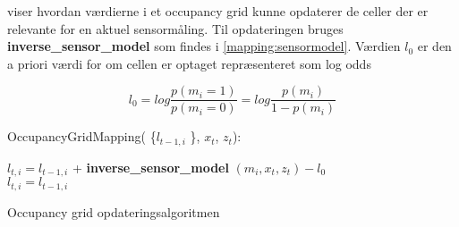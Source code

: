  viser hvordan værdierne i et occupancy grid kunne opdaterer de celler der er relevante for en aktuel sensormåling. 
Til opdateringen bruges \textbf{inverse\_sensor\_model} som findes i \cref{mapping:sensormodel}. 
Værdien $ l_0 $ er den a priori værdi for om cellen er optaget repræsenteret som log odds

\[ l_0 =  log \frac{p(m_i = 1)}{p(m_i = 0)} = log \frac{p(m_i)}{1- p(m_i)} \]

\begin{algorithm}[H]
\LinesNumbered
OccupancyGridMapping( \{$ l_{t-1,i} $ \}, $ x_t $, $ z_t $):

{
{ $ l_{t,i} = l_{t-1,i} $ + \textbf{inverse\_sensor\_model} $( m_i, x_t, z_t ) - l_0$\\ }
{ $ l_{t,i} = l_{t-1,i}  $\\ }
}
\caption{Occupancy grid opdateringsalgoritmen}\label{occupancygrid:alg}
\end{algorithm}




